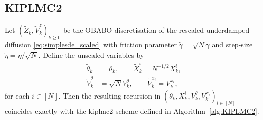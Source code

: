 \subsection{KIPLMC2}\label{app:algderivKIPLMC2}
\begin{proposition}\label{prop:kipld_kiplmc2}
Let $(\widetilde{Z}_k,\widetilde{V}_k^z)_{k\geq 0}$ be the OBABO discretisation of the rescaled underdamped diffusion \eqref{eq:simplesde_scaled} with friction parameter $\widetilde{\gamma}=\sqrt{N}\gamma$ and step-size $\widetilde{\eta}=\eta/\sqrt{N}$. Define the unscaled variables by
\begin{align*}
\widetilde{\theta}_k &= \theta_k,\qquad \widetilde{X}_k^i = N^{-1/2}X_k^i,\\
\widetilde{V}_k^\theta &= \sqrt{N}V_k^\theta,\qquad \widetilde{V}_k^{x_i} = V_k^{x_i},
\end{align*}
for each $i\in[N]$. Then the resulting recursion in $(\theta_k,X_k^i,V_k^\theta,V_k^{x_i})_{i\in[N]}$ coincides exactly with the \gls*{kiplmc2} scheme defined in Algorithm~\ref{alg:KIPLMC2}.
\end{proposition}
